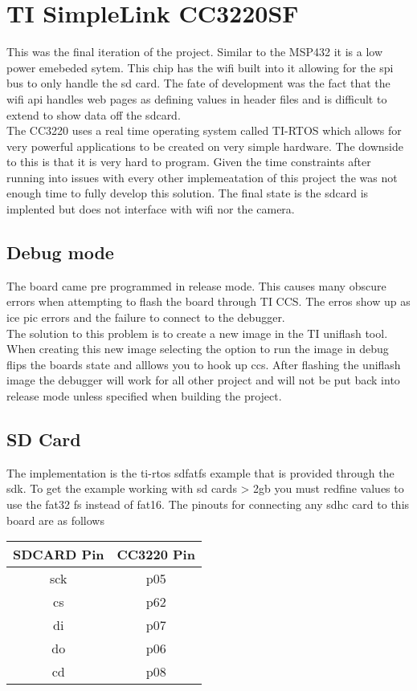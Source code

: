 \documentclass{article}
\begin{document}
\section{TI SimpleLink CC3220SF}
This was the final iteration of the project. Similar to the MSP432 it is a low power emebeded sytem. This chip has the wifi built into it allowing for the spi bus to only handle the sd card.
The fate of development was the fact that the wifi api handles web pages as defining values in header files and is difficult to extend to show data off the sdcard.\\
The CC3220 uses a real time operating system called TI-RTOS which allows for very powerful applications to be created on very simple hardware. The downside to this is that it is very hard to program. Given the time constraints after running into issues with every other implemeatation of this project the was not enough time to fully develop this solution. The final state is the sdcard is implented but does not interface with wifi nor the camera.

\subsection{Debug mode}
The board came pre programmed in release mode. This causes many obscure errors when attempting to flash the board through TI CCS. The erros show up as ice pic errors and the failure to connect to the debugger.\\
The solution to this problem is to create a new image in the TI uniflash tool. When creating this new image selecting the option to run the image in debug flips the boards state and alllows you to hook up ccs. After flashing the uniflash image the debugger will work for all other project and will not be put back into release mode unless specified when building the project.

\subsection{SD Card}
The implementation is the ti-rtos sdfatfs example that is provided through the sdk. To get the example working with sd cards > 2gb you must redfine values to use the fat32 fs instead of fat16.
The pinouts for connecting any sdhc card to this board are as follows

\begin{center}
\begin{tabular}{|c|c|}
    \hline
    SDCARD Pin & CC3220 Pin \\
    \hline
    sck & p05 \\
    cs & p62 \\
    di & p07 \\
    do & p06 \\
    cd & p08 \\
    \hline
\end{tabular}

\end{center}
\end{document}
